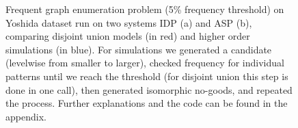 \begin{figure}[h]
\begin{subfigure}{0.46\textwidth}
  \label{fig:decomposition_asp}
\end{subfigure}
\caption{\footnotesize{Frequent graph enumeration problem (5\% frequency threshold) on Yoshida dataset \cite{yoshida_dataset} run on two systems IDP (a) and ASP (b), comparing disjoint union models (in red) and higher order simulations (in blue). For simulations we generated a candidate (levelwise from smaller to larger), checked frequency for individual patterns until we reach the threshold (for disjoint union this step is done in one call), then generated isomorphic no-goods, and repeated the process. Further explanations and the code can be found in the appendix.}}
\label{fig:decomposition_fol}
\end{figure}
